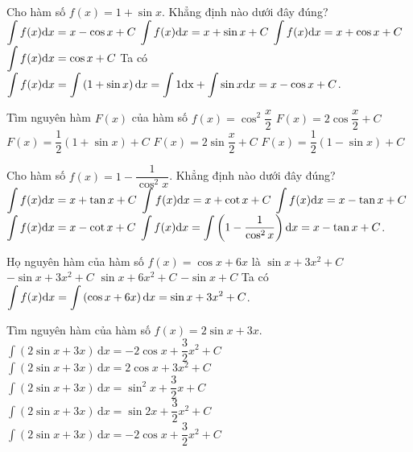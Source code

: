\begin{ex}%
	Cho hàm số $f(x)=1+\sin x$. Khẳng định nào dưới đây đúng?
	\choice
	{\True $\displaystyle\int{f(x){\rm{d}}x}=x-\cos x+C$}
	{$\displaystyle\int{f(x){\rm{d}}x}=x+\sin x+C$}
	{$\displaystyle\int{f(x){\rm{d}}x}=x+\cos x+C$}
	{$\displaystyle\int{f(x){\rm{d}}x}=\cos x+C$}
	\loigiai
	{Ta có $\displaystyle\int{f(x){\rm{d}}x=\displaystyle\int{\left(1+\sin x\right){\rm{d}}x}=\displaystyle\int{1\rm{d}x}+\displaystyle\int{\sin x{\rm{d}}x}=x-\cos x+C}$.}
\end{ex}

\begin{ex}%
	Tìm nguyên hàm $F(x)$ của hàm số $f(x)=\cos ^2\dfrac{x}{2}$
	\choice
	{$F(x)=2\cos\dfrac{x}{2}+C$}
	{\True $F(x)=\dfrac{1}{2}\left(1+\sin x\right)+C$}
	{$F(x)=2\sin\dfrac{x}{2}+C$}
	{$F(x)=\dfrac{1}{2}\left(1-\sin x\right)+C$}
\end{ex}

\begin{ex}%
	Cho hàm số $f(x)=1-\dfrac{1}{\cos^2x}$. Khẳng định nào dưới đây đúng?
	\choice
	{$\displaystyle\int{f(x){\rm{d}}x}=x+\tan x+C$}
	{$\displaystyle\int{f(x){\rm{d}}x}=x+\cot x+C$}
	{\True $\displaystyle\int{f(x){\rm{d}}x}=x-\tan x+C$}
	{$\displaystyle\int{f(x){\rm{d}}x}=x-\cot x+C$}
	\loigiai
	{
		$\displaystyle\int{f(x){\rm{d}}x}=\displaystyle\int{\left(1-\dfrac{1}{\cos^2x}\right){\rm{d}}x}=x-\tan x+C$.}
\end{ex}

\begin{ex}%
	Họ nguyên hàm của hàm số $f(x)=\cos x+6x$ là
	\choice
	{\True $\sin x+3x^2+C$}
	{$-\sin x+3x^2+C$}
	{$\sin x+6x^2+C$}
	{$-\sin x+C$}
	\loigiai
	{
		Ta có $\displaystyle\int{f(x){\rm{d}}x=\displaystyle\int{\left(\cos x+6x\right){\rm{d}}x=\sin x+3x^2+C}}$.}
\end{ex}

\begin{ex}%
	Tìm nguyên hàm của hàm số $f(x)=2\sin x+3x$.
	\choice
	{\True $\displaystyle\int{\left(2\sin x+3x\right)\mathrm{\,d}x=-2\cos x+\dfrac{3}{2}{x^2}+C}$}
	{$\displaystyle\int{\left(2\sin x+3x\right)\mathrm{\,d}x=2\cos x+3x^2+C}$}
	{$\displaystyle\int{\left(2\sin x+3x\right)\mathrm{\,d}x=\sin^2x+\dfrac{3}{2}x+C}$}
	{$\displaystyle\int{\left(2\sin x+3x\right)\mathrm{\,d}x=\sin 2x+\dfrac{3}{2}{x^2}+C}$}
	\loigiai
	{
		$\displaystyle\int{\left(2\sin x+3x\right)\mathrm{\,d}x}=-2\cos x+\dfrac{3}{2}{x^2}+C$}
\end{ex}

